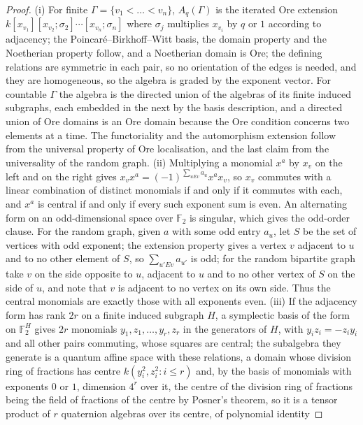 \documentclass[11pt]{article}
\theoremstyle{definition}
\newcommand{\Fq}{\mathbb F}
\begin{document}
\begin{proof}
{\rm(i)} For finite $\Gamma=\{v_1<\dots<v_n\}$, $A_q(\Gamma)$ is the iterated
Ore extension $k[x_{v_1}][x_{v_2};\sigma_2]\cdots[x_{v_n};\sigma_n]$ where
$\sigma_j$ multiplies $x_{v_i}$ by $q$ or $1$ according to adjacency; the Poincar\'e--Birkhoff--Witt basis, the domain property and the Noetherian
property follow, and a Noetherian domain is
Ore; the defining relations are symmetric in each pair, so no orientation
of the edges is needed, and they are homogeneous, so the algebra is graded
by the exponent vector.  For countable $\Gamma$ the algebra is the directed union of the
algebras of its finite induced subgraphs, each embedded in the next by the
basis description, and a directed union of Ore domains is an Ore domain
because the Ore condition concerns two elements at a time.  The functoriality
and the automorphism extension follow from the universal property of Ore
localisation, and the last claim from the universality of the
random graph.
{\rm(ii)} Multiplying a monomial $x^a$ by $x_v$ on the left and on the right
gives $x_vx^a=(-1)^{\sum_{uEv}a_u}x^ax_v$, so $x_v$ commutes with a linear
combination of distinct monomials if and only if it commutes with each, and
$x^a$ is central if and only if every such exponent sum is even.  An
alternating form on an odd-dimensional space over $\Fq_2$ is singular, which
gives the odd-order clause.  For the random graph, given $a$ with some odd
entry $a_u$, let $S$ be the set of vertices with odd exponent; the extension
property gives a vertex $v$ adjacent to $u$ and to no other element of $S$,
so $\sum_{u'Ev}a_{u'}$ is odd; for the random bipartite graph take $v$ on the
side opposite to $u$, adjacent to $u$ and to no other vertex of $S$ on the
side of $u$, and note that $v$ is adjacent to no vertex on its own side.
Thus the central monomials are exactly those with all exponents even.
{\rm(iii)} If
the adjacency form has rank $2r$ on a finite induced subgraph $H$, a
symplectic basis of the form on $\Fq_2^H$ gives $2r$ monomials
$y_1,z_1,\dots,y_r,z_r$ in the generators of $H$, with $y_iz_i=-z_iy_i$ and
all other pairs commuting, whose squares are central; the subalgebra they generate is a quantum
affine space with these relations, a domain whose division ring of
fractions has centre $k(y_i^2,z_i^2:i\le r)$ and, by the basis of monomials
with exponents $0$ or $1$, dimension $4^r$ over it, the centre of the division ring of fractions
being the field of fractions of the centre by Posner's theorem, so it is
a tensor product of $r$ quaternion algebras over its centre, of polynomial identity

\end{proof}
\end{document}
